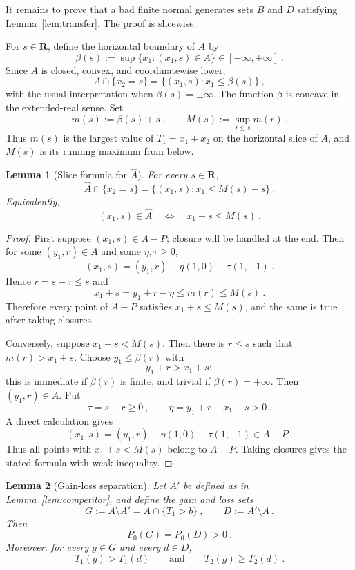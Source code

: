 \documentclass[12pt]{article}
\newtheorem{lemma}{Lemma}
\theoremstyle{remark}
\begin{document}
It remains to prove that a bad finite normal generates sets $B$ and $D$ satisfying Lemma~\ref{lem:transfer}.  The proof is slicewise.

For $s\in\mathbf R$, define the horizontal boundary of $A$ by
\[
\beta(s):=\sup\{x_1:(x_1,s)\in A\}\in[-\infty,+\infty]~.
\]
Since $A$ is closed, convex, and coordinatewise lower,
\[
A\cap\{x_2=s\}=\{(x_1,s):x_1\le \beta(s)\}~,
\]
with the usual interpretation when $\beta(s)=\pm\infty$.  The function $\beta$ is concave in the extended-real sense.  Set
\[
m(s):=\beta(s)+s~,
\qquad
M(s):=\sup_{r\le s}m(r)~.
\]
Thus $m(s)$ is the largest value of $T_1=x_1+x_2$ on the horizontal slice of $A$, and $M(s)$ is its running maximum from below.

\begin{lemma}[Slice formula for $\widehat A$]\label{lem:slice-formula}
For every $s\in\mathbf R$,
\[
\widehat A\cap\{x_2=s\}
=
\{(x_1,s):x_1\le M(s)-s\}~.
\]
Equivalently,
\[
(x_1,s)\in\widehat A
\quad\Longleftrightarrow\quad
x_1+s\le M(s)~.
\]
\end{lemma}

\begin{proof}
First suppose $(x_1,s)\in A-P$; closure will be handled at the end.  Then for some $(y_1,r)\in A$ and some $\eta,\tau\ge0$,
\[
(x_1,s)=(y_1,r)-\eta(1,0)-\tau(1,-1)~.
\]
Hence $r=s-\tau\le s$ and
\[
x_1+s=y_1+r-\eta\le m(r)\le M(s)~.
\]
Therefore every point of $A-P$ satisfies $x_1+s\le M(s)$, and the same is true after taking closures.

Conversely, suppose $x_1+s<M(s)$.  Then there is $r\le s$ such that $m(r)>x_1+s$.  Choose $y_1\le\beta(r)$ with
\[
y_1+r>x_1+s;
\]
this is immediate if $\beta(r)$ is finite, and trivial if $\beta(r)=+\infty$.  Then $(y_1,r)\in A$.  Put
\[
\tau=s-r\ge0~,
\qquad
\eta=y_1+r-x_1-s>0~.
\]
A direct calculation gives
\[
(x_1,s)=(y_1,r)-\eta(1,0)-\tau(1,-1)\in A-P~.
\]
Thus all points with $x_1+s<M(s)$ belong to $A-P$.  Taking closures gives the stated formula with weak inequality.
\end{proof}

\begin{lemma}[Gain-loss separation]\label{lem:gain-loss}
Let $A'$ be defined as in Lemma~\ref{lem:competitor}, and define the gain and loss sets
\[
G:=A\setminus A'=A\cap\{T_1>b\}~,
\qquad
D:=A'\setminus A~.
\]
Then
\[
P_0(G)=P_0(D)>0~.
\]
Moreover, for every $g\in G$ and every $d\in D$,
\[
T_1(g)>T_1(d)
\qquad\text{and}\qquad
T_2(g)\ge T_2(d)~.
\]
\end{lemma}
\end{document}
